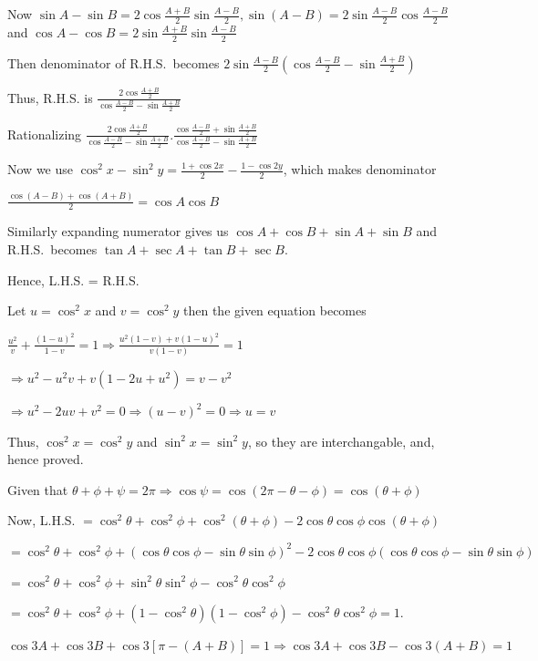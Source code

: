   Now $\sin A - \sin B = 2\cos\frac{A + B}{2}\sin\frac{A - B}{2}, \sin(A - B) = 2\sin\frac{A -
    B}{2}\cos\frac{A - B}{2}$ and $\cos A - \cos B = 2\sin \frac{A + B}{2}\sin\frac{A - B}{2}$

  Then denominator of R.H.S.\ becomes $2\sin\frac{A - B}{2}\left(\cos\frac{A - B}{2} - \sin\frac{A +
    B}{2}\right)$

  Thus, R.H.S. is $\frac{2\cos\frac{A + B}{2}}{\cos\frac{A - B}{2} - \sin\frac{A + B}{2}}$

  Rationalizing $\frac{2\cos\frac{A + B}{2}}{\cos\frac{A - B}{2} - \sin\frac{A + B}{2}}.\frac{\cos\frac{A -
      B}{2} + \sin\frac{A + B}{2}}{\cos\frac{A - B}{2} - \sin\frac{A + B}{2}}$

  Now we use $\cos^2x - \sin^2y = \frac{1 + \cos2x}{2} - \frac{1 - \cos 2y}{2}$, which makes denominator

  $\frac{\cos(A - B) + \cos(A + B)}{2} = \cos A\cos B$

  Similarly expanding numerator gives us $\cos A + \cos B + \sin A + \sin B$ and R.H.S.\ becomes $\tan A
  + \sec A + \tan B + \sec B$.

  Hence, L.H.S. = R.H.S.
\item Let $u = \cos^2x$ and $v = \cos^2y$ then the given equation becomes

  $\frac{u^2}{v} + \frac{(1 - u)^2}{1 - v} = 1\Rightarrow \frac{u^2(1 - v) + v(1 - u)^2}{v(1 - v)} = 1$

  $\Rightarrow u^2 - u^2v + v\left(1 - 2u + u^2\right) = v - v^2$

  $\Rightarrow u^2 - 2uv + v^2 = 0 \Rightarrow (u - v)^2 = 0 \Rightarrow u = v$

  Thus, $\cos^2x = \cos^2y$ and $\sin^2x = \sin^2y$, so they are interchangable, and, hence proved.
\item Given that $\theta + \phi + \psi = 2\pi\Rightarrow \cos\psi = \cos(2\pi - \theta - \phi) = \cos(\theta
  + \phi)$

  Now, L.H.S. $= \cos^2\theta + \cos^2\phi + \cos^2(\theta + \phi) - 2\cos\theta\cos\phi\cos(\theta + \phi)$

  $= \cos^2\theta + \cos^2\phi + (\cos\theta\cos\phi - \sin\theta\sin\phi)^2 -
  2\cos\theta\cos\phi(\cos\theta\cos\phi - \sin\theta\sin\phi)$

  $= \cos^2\theta + \cos^2\phi + \sin^2\theta\sin^2\phi - \cos^2\theta\cos^2\phi$

  $= \cos^2\theta + \cos^2\phi + (1 - \cos^2\theta)(1 - \cos^2\phi) - \cos^2\theta\cos^2\phi = 1$.
\item $\cos3A + \cos3B + \cos3[\pi - (A + B)] = 1 \Rightarrow \cos3A + \cos3B - \cos3(A + B) = 1$

